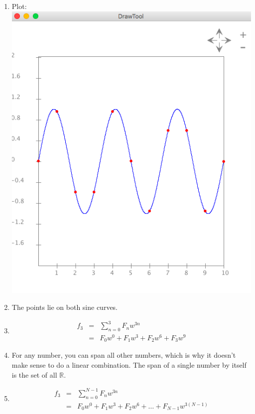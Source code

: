 \documentclass{article}
\begin{document}
\begin{enumerate}
\item Plot:\\
\includegraphics[scale=0.5]{exercise9}

\item The points lie on both sine curves.

\item 
\begin{eqnarray*}
f_3 &=& \sum_{n=0}^{3} F_nw^{3n}\\
&=& F_0w^0 + F_1w^3 + F_2w^6 + F_3w^9
\end{eqnarray*}

\item For any number, you can span all other numbers, which is why it doesn't make sense to do a linear combination. The span of a single number by itself is the set of all $\mathbb{R}$.

\item 
\begin{eqnarray*}
f_3 &=& \sum_{n=0}^{N-1} F_nw^{3n}\\
&=& F_0w^0 + F_1w^3 + F_2w^6 + \dots + F_{N-1}w^{3(N-1)}
\end{eqnarray*}


\end{enumerate}
\end{document}
